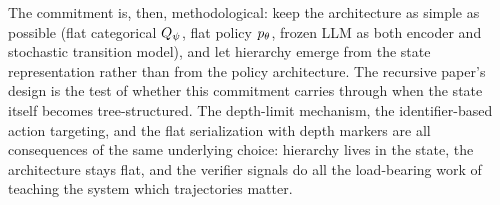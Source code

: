 The commitment is, then, methodological: keep the architecture as simple
as possible (flat categorical $Q_{\psi}$, flat policy $p_{\theta}$, frozen
LLM as both encoder and stochastic transition model), and let hierarchy
emerge from the state representation rather than from the policy
architecture. The recursive paper's design is the test of whether this
commitment carries through when the state itself becomes
tree-structured. The depth-limit mechanism, the identifier-based action
targeting, and the flat serialization with depth markers are all
consequences of the same underlying choice: hierarchy lives in the
state, the architecture stays flat, and the verifier signals do all the
load-bearing work of teaching the system which trajectories matter.
